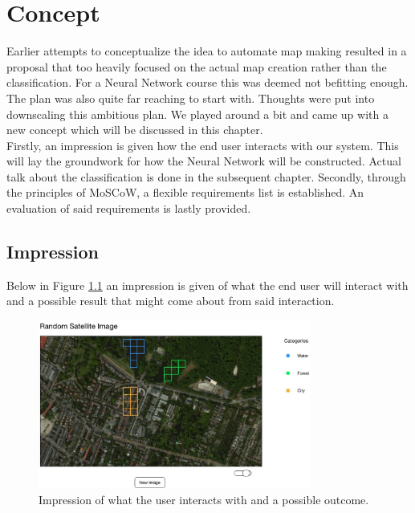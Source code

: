\documentclass[a4paper,onecolumn]{report}
\begin{document}
\chapter{Concept}
\label{chap:concept}
Earlier attempts to conceptualize the idea to automate map making resulted in a proposal that too heavily focused on the actual map creation rather than the classification. For a Neural Network course this was deemed not befitting enough. The plan was also quite far reaching to start with. Thoughts were put into downscaling this ambitious plan. We played around a bit and came up with a new concept which will be discussed in this chapter.\\

Firstly, an impression is given how the end user interacts with our system. This will lay the groundwork for how the Neural Network will be constructed. Actual talk about the classification is done in the subsequent chapter. Secondly, through the principles of MoSCoW, a flexible requirements list is established. An evaluation of said requirements is lastly provided. 

\section{Impression}

Below in Figure \ref{fig:impression} an impression is given of what the end user will interact with and a possible result that might come about from said interaction.\\

\begin{figure}[h!]
    \centering
    \includegraphics[width=0.8\textwidth]{./images/impression_toggle.jpg}
    \caption{Impression of what the user interacts with and a possible outcome.}
	\label{fig:impression}
\end{figure}
\end{document}
